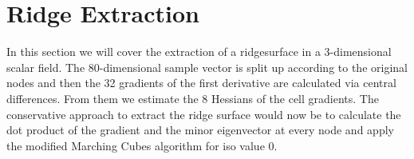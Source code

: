 \section{Ridge Extraction}\label{sec:ridgeextract}

In this section we will cover the extraction of a ridgesurface in a
3-dimensional scalar field. The 80-dimensional sample vector is split up
according to the original nodes and then the 32 gradients of the first
derivative are calculated via central differences. From them we estimate
the 8 Hessians of the cell gradients. The conservative approach to
extract the ridge surface would now be to calculate the dot product of
the gradient and the minor eigenvector at every node and apply the
modified Marching Cubes algorithm for iso value 0.
